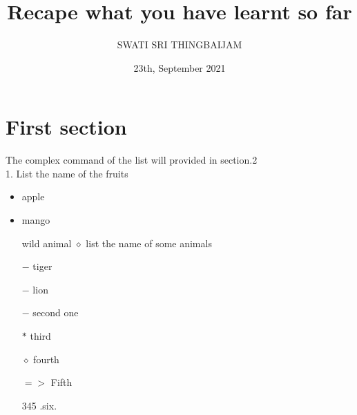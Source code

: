 \documentclass[12pt]{article}
\title{Recape what you have learnt so far}
\author{SWATI SRI THINGBAIJAM}
\date{23th, September 2021}
\begin{document}
\maketitle
{}
\section{First section}\label{sec1} 
The complex command of the list will provided in section.2
\\1. List the name of the fruits
\begin{itemize}
\item apple
\item mango
\end{itemize}
\begin{itemize}
\centering
\huge
\itshape
\item[wild animal $\diamond$] list the name of some animals
\item[$-$]tiger
\item[$-$]lion
\end{itemize}
\begin{itemize}
\item[$-$]second one
\item[$\ast$]third 
\item[$\diamond$]fourth
\end{itemize}
\begin{itemize}
\item[$=>$]Fifth 
\item[345].six.
\end{itemize}
\newpage
\end{document}
